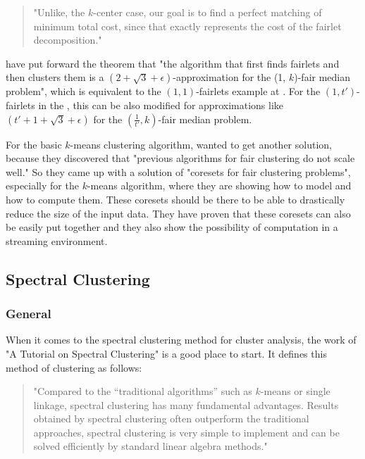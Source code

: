 \begin{quote}
"Unlike, the $k$-center case, our goal is to find a perfect matching of minimum total cost, since that exactly represents the cost of the fairlet decomposition."
\autocite[9]{Chierichetti2018}
\end{quote}

\textcite[]{Chierichetti2018} have put forward the theorem that "the algorithm that first finds fairlets and then clusters them is a $(2 + \sqrt{3} + \epsilon)$-approximation for the (1, $k$)-fair median problem", which is equivalent to the $(1, 1)$-fairlets example at . For the $(1,t')$-fairlets in the , this can be also modified for approximations like $(t' + 1 + \sqrt{3} + \epsilon)$ for the $(\frac{1}{t'}, k)$-fair median problem. \autocite[9]{Chierichetti2018}

For the basic $k$-means clustering algorithm, \textcite[]{Schmidt2018} wanted to get another solution, because they discovered that "previous algorithms for fair clustering do not scale well." So they came up with a solution of "coresets for fair clustering problems", especially for the $k$-means algorithm, where they are showing how to model and how to compute them. These coresets should be there to be able to drastically reduce the size of the input data. They have proven that these coresets can also be easily put together and they also show the possibility of computation in a streaming environment. \autocite[1]{Schmidt2018} 


\subsection{Spectral Clustering}
\label{spectral-clustering}

\subsubsection{General}

When it comes to the spectral clustering method for cluster analysis, the work of \textcite[]{VonLuxburg2007}  "A Tutorial on Spectral Clustering" is a good place to start. It defines this method of clustering as follows:

\begin{quote}
"Compared to the “traditional algorithms” such as $k$-means or single linkage, spectral clustering has many fundamental advantages. Results obtained by spectral clustering often outperform the traditional approaches, spectral clustering is very simple to implement and can be solved efficiently by standard linear algebra methods."
\autocite[1]{VonLuxburg2007}
\end{quote}

